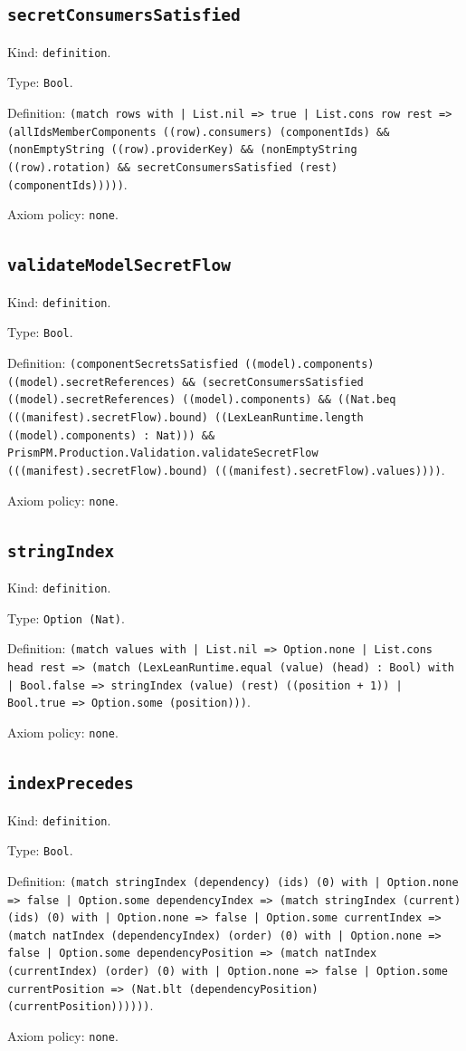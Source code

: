 \documentclass[11pt]{article}
\begin{document}
\subsection*{\texttt{secretConsumersSatisfied}}
\noindent Kind: \texttt{definition}.\par
\noindent Type: \texttt{Bool}.\par
\noindent Definition: \texttt{(match rows with | List.nil => true | List.cons row rest => (allIdsMemberComponents ((row).consumers) (componentIds) \&\& (nonEmptyString ((row).providerKey) \&\& (nonEmptyString ((row).rotation) \&\& secretConsumersSatisfied (rest) (componentIds)))))}.\par
\noindent Axiom policy: \texttt{none}.\par
\subsection*{\texttt{validateModelSecretFlow}}
\noindent Kind: \texttt{definition}.\par
\noindent Type: \texttt{Bool}.\par
\noindent Definition: \texttt{(componentSecretsSatisfied ((model).components) ((model).secretReferences) \&\& (secretConsumersSatisfied ((model).secretReferences) ((model).components) \&\& ((Nat.beq (((manifest).secretFlow).bound) ((LexLeanRuntime.length ((model).components) : Nat))) \&\& PrismPM.Production.Validation.validateSecretFlow (((manifest).secretFlow).bound) (((manifest).secretFlow).values))))}.\par
\noindent Axiom policy: \texttt{none}.\par
\subsection*{\texttt{stringIndex}}
\noindent Kind: \texttt{definition}.\par
\noindent Type: \texttt{Option (Nat)}.\par
\noindent Definition: \texttt{(match values with | List.nil => Option.none | List.cons head rest => (match (LexLeanRuntime.equal (value) (head) : Bool) with | Bool.false => stringIndex (value) (rest) ((position + 1)) | Bool.true => Option.some (position)))}.\par
\noindent Axiom policy: \texttt{none}.\par
\subsection*{\texttt{indexPrecedes}}
\noindent Kind: \texttt{definition}.\par
\noindent Type: \texttt{Bool}.\par
\noindent Definition: \texttt{(match stringIndex (dependency) (ids) (0) with | Option.none => false | Option.some dependencyIndex => (match stringIndex (current) (ids) (0) with | Option.none => false | Option.some currentIndex => (match natIndex (dependencyIndex) (order) (0) with | Option.none => false | Option.some dependencyPosition => (match natIndex (currentIndex) (order) (0) with | Option.none => false | Option.some currentPosition => (Nat.blt (dependencyPosition) (currentPosition))))))}.\par
\noindent Axiom policy: \texttt{none}.\par
\end{document}
